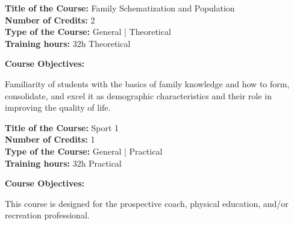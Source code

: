\documentclass[12pt,a4paper]{article}
\begin{document}
\newpage
\nopagebreak
\textbf{Title of the Course:} Family Schematization and Population\\
\textbf{Number of Credits:} 2\\
\textbf{Type of the Course:} General | Theoretical\\
\textbf{Training hours:} 32h Theoretical\par\vspace{4pt}
\textbf{Course Objectives:}\par\vspace{2pt}
Familiarity of students with the basics of family knowledge and how to form, consolidate, and
excel it as demographic characteristics and their role in improving the quality of life.\par\vspace{4pt}

\par\vspace{14pt}
\nopagebreak
\textbf{Title of the Course:} Sport 1\\
\textbf{Number of Credits:} 1\\
\textbf{Type of the Course:} General | Practical\\
\textbf{Training hours:} 32h Practical\par\vspace{4pt}
\textbf{Course Objectives:}\par\vspace{2pt}
This course is designed for the prospective coach, physical education, and/or recreation
professional.\par\vspace{4pt}
\end{document}
